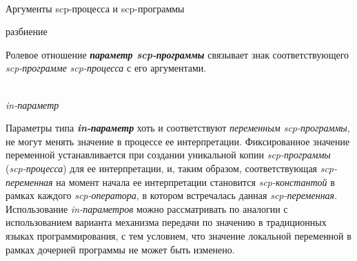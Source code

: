 \begin{frame}{\\Аргументы scp-процесса и scp-программы}
	\topline
	\justifying
	
	\begin{SCn}
		\begin{scnrelfromset}{разбиение}
		\end{scnrelfromset}
	\end{SCn}
	
	Ролевое отношение \textbf{\textit{параметр scp-программы\scnrolesign}} связывает знак соответствующего \textit{scp-программе} \textit{\mbox{scp-процесса}} с его аргументами.
	
\end{frame}


\begin{frame}{\\\textit{in-параметр\scnrolesign}}
	\topline
	\justifying
	
	Параметры типа \textbf{\textit{in-параметр\scnrolesign}} хоть и соответствуют \textit{переменным scp-программы\scnrolesign}, не могут менять значение в процессе ее интерпретации. Фиксированное значение переменной устанавливается при создании уникальной копии \textit{scp-программы} (\textit{scp-процесса}) для ее интерпретации, и, таким образом, соответствующая \textit{scp-переменная\scnrolesign} на момент начала ее интерпретации становится \textit{scp-константой\scnrolesign} в рамках каждого \textit{scp-оператора}, в котором встречалась данная \textit{scp-переменная\scnrolesign}. Использование \textit{in-параметров} можно рассматривать по аналогии с использованием варианта механизма передачи по значению в традиционных языках программирования, с тем условием, что значение локальной переменной в рамках дочерней программы не может быть изменено.
	
\end{frame}

